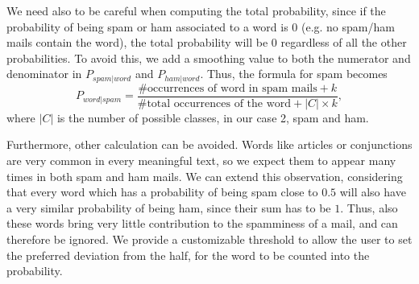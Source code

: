 We need also to be careful when computing the total probability, since if the probability of being spam or ham associated to a word is $0$ (e.g. no spam/ham mails contain the word), the total probability will be $0$ regardless of all the other probabilities. To avoid this, we add a smoothing value to both the numerator and denominator in $P_{spam|word}$ and $P_{ham|word}$. Thus, the formula for spam becomes $$P_{word|spam} = \frac{\mbox{\# occurrences of word in spam mails} + k}{\mbox{\# total occurrences of the word} + |C|\times k},$$ where $|C|$ is the number of possible classes, in our case 2, spam and ham.

Furthermore, other calculation can be avoided. Words like articles or conjunctions are very common in every meaningful text, so we expect them to appear many times in both spam and ham mails. We can extend this observation, considering that every word which has a probability of being spam close to $0.5$ will also have a very similar probability of being ham, since their sum has to be $1$. Thus, also these words bring very little contribution to the spamminess of a mail, and can therefore be ignored. We provide a customizable threshold to allow the user to set the preferred deviation from the half, for the word to be counted into the probability.
